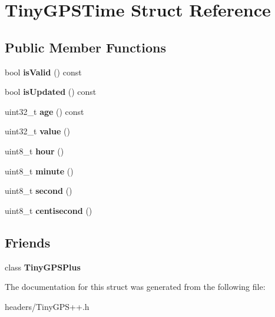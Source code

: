 \section{Tiny\+G\+P\+S\+Time Struct Reference}
\label{struct_tiny_g_p_s_time}
\subsection*{Public Member Functions}
\begin{DoxyCompactItemize}
\item 
bool {\bfseries is\+Valid} () const \label{struct_tiny_g_p_s_time_a85c38acaf804aecefc3f0358bf93d86a}

\item 
bool {\bfseries is\+Updated} () const \label{struct_tiny_g_p_s_time_a48850598e5ae6dd6813bbfd5af7589fc}

\item 
uint32\+\_\+t {\bfseries age} () const \label{struct_tiny_g_p_s_time_a22b59e1d4b22435baa2a4446981f2dce}

\item 
uint32\+\_\+t {\bfseries value} ()\label{struct_tiny_g_p_s_time_afcdb632fee9d144b1414c9d7b95719f1}

\item 
uint8\+\_\+t {\bfseries hour} ()\label{struct_tiny_g_p_s_time_a37fdb629b6ed0e31134214c7d07df2b1}

\item 
uint8\+\_\+t {\bfseries minute} ()\label{struct_tiny_g_p_s_time_aef83c20c14d404219299da2d7e35cdce}

\item 
uint8\+\_\+t {\bfseries second} ()\label{struct_tiny_g_p_s_time_a729cab36ced07eb5607503663fbe33e8}

\item 
uint8\+\_\+t {\bfseries centisecond} ()\label{struct_tiny_g_p_s_time_a1f74ad4a2a53e0ee19f8e3a6b2bc985f}

\end{DoxyCompactItemize}
\subsection*{Friends}
\begin{DoxyCompactItemize}
\item 
class {\bfseries Tiny\+G\+P\+S\+Plus}\label{struct_tiny_g_p_s_time_a6501fd5ef19ae166d43e0e5781609ee2}

\end{DoxyCompactItemize}


The documentation for this struct was generated from the following file\+:\begin{DoxyCompactItemize}
\item 
headers/Tiny\+G\+P\+S++.\+h\end{DoxyCompactItemize}

